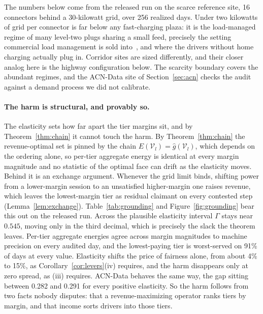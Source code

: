 \documentclass[manuscript, screen, review, anonymous]{acmart}
\begin{document}
The numbers below come from the released run on the scarce reference site, 16 connectors behind a 30-kilowatt grid, over 256 realized days. Under two kilowatts of grid per connector is far below any fast-charging plaza: it is the load-managed regime of many level-two plugs sharing a small feed, precisely the setting commercial load management is sold into~\cite{ampeco2026}, and where the drivers without home charging actually plug in. Corridor sites are sized differently, and their closer analog here is the highway configuration below. The scarcity boundary covers the abundant regimes, and the ACN-Data site of Section~\ref{sec:acn} checks the audit against a demand process we did not calibrate.

\paragraph{The harm is structural, and provably so.}
The elasticity sets how far apart the tier margins sit, and by Theorem~\ref{thm:chain} it cannot touch the harm. By Theorem~\ref{thm:chain} the revenue-optimal set is pinned by the chain $E(\mathcal{V}_l)=\hat g(\mathcal{V}_l)$, which depends on the ordering alone, so per-tier aggregate energy is identical at every margin magnitude and no statistic of the optimal face can drift as the elasticity moves. Behind it is an exchange argument. Whenever the grid limit binds, shifting power from a lower-margin session to an unsatisfied higher-margin one raises revenue, which leaves the lowest-margin tier as residual claimant on every contested step (Lemma~\ref{lem:exchange}). Table~\ref{tab:grounding} and Figure~\ref{fig:grounding} bear this out on the released run. Across the plausible elasticity interval $\Gamma$ stays near $0.545$, moving only in the third decimal, which is precisely the slack the theorem leaves. Per-tier aggregate energies agree across margin magnitudes to machine precision on every audited day, and the lowest-paying tier is worst-served on 91\% of days at every value. Elasticity shifts the price of fairness alone, from about 4\% to 15\%, as Corollary~\ref{cor:levers}(iv) requires, and the harm disappears only at zero spread, as (iii) requires. ACN-Data behaves the same way, the gap sitting between 0.282 and 0.291 for every positive elasticity. So the harm follows from two facts nobody disputes: that a revenue-maximizing operator ranks tiers by margin, and that income sorts drivers into those tiers.
\end{document}
